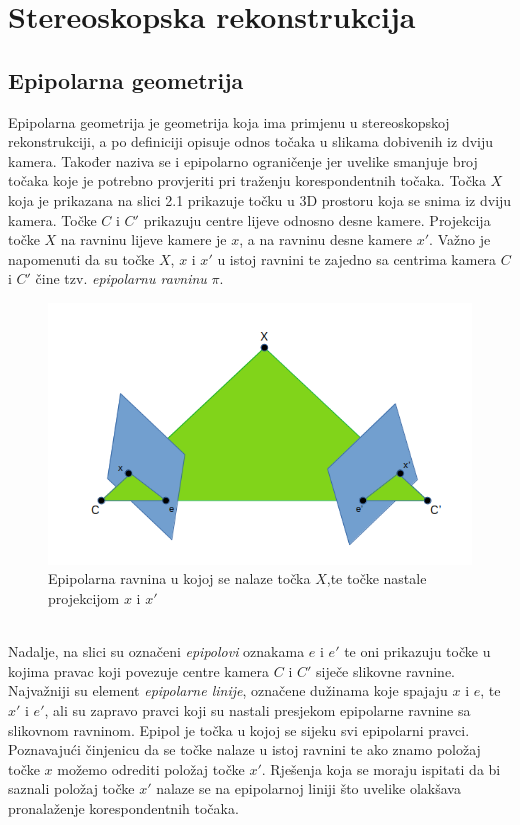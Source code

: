 \documentclass[times, utf8, zavrsni, numeric]{fer}
\begin{document}
\chapter{Stereoskopska rekonstrukcija}
\section{Epipolarna geometrija}
Epipolarna geometrija je geometrija koja ima primjenu u stereoskopskoj rekonstrukciji, a po definiciji opisuje odnos točaka u slikama dobivenih iz dviju kamera. Također naziva se i epipolarno ograničenje jer uvelike smanjuje broj točaka koje je potrebno provjeriti pri traženju korespondentnih točaka. Točka $X$ koja je prikazana na slici 2.1 prikazuje točku u 3D prostoru koja se snima iz dviju kamera. Točke $C$ i $C'$ prikazuju centre lijeve odnosno desne kamere. Projekcija točke $X$ na ravninu lijeve kamere je $x$, a na ravninu desne kamere $x'$. Važno je napomenuti da su točke $X$, $x$ i $x'$ u istoj ravnini te zajedno sa centrima kamera $C$ i $C'$ čine tzv. \textit{epipolarnu ravninu} $\pi$.\\
\begin{figure}[htb]
\centering
\includegraphics[scale=0.46]{img/slika1.png}
\caption{Epipolarna ravnina u kojoj se nalaze točka $X$,te točke nastale projekcijom $x$ i $x'$}
\label{fig:Epipolar}
\end{figure}\\
Nadalje, na slici su označeni \textit{epipolovi} oznakama $e$ i $e'$ te oni prikazuju točke u kojima pravac koji povezuje centre kamera $C$ i $C'$ siječe slikovne ravnine.
Najvažniji su element \textit{epipolarne linije}, označene dužinama koje spajaju $x$ i $e$, te $x'$ i $e'$, ali su zapravo pravci koji su nastali presjekom epipolarne ravnine sa slikovnom ravninom. Epipol je točka u kojoj se sijeku svi epipolarni pravci.\\
Poznavajući činjenicu da se točke nalaze u istoj ravnini te ako znamo položaj točke $x$ možemo odrediti položaj točke $x'$. Rješenja koja se moraju ispitati da bi saznali položaj točke $x'$ nalaze se na epipolarnoj liniji što uvelike olakšava pronalaženje korespondentnih točaka.
\end{document}
